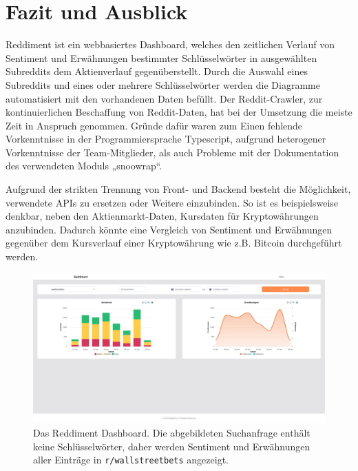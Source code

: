 \documentclass[a4paper, 10pt, conference]{IEEEtran}
\begin{document}
\section{Fazit und Ausblick} \label{s:fazit}

Reddiment ist ein webbasiertes Dashboard, welches den zeitlichen Verlauf von Sentiment und Erwähnungen bestimmter Schlüsselwörter in ausgewählten Subreddits dem Aktienverlauf gegenüberstellt. Durch die Auswahl eines Subreddits und eines oder mehrere Schlüsselwörter werden die Diagramme automatisiert mit den vorhandenen Daten befüllt.
Der Reddit-Crawler, zur kontinuierlichen Beschaffung von Reddit-Daten, hat bei der Umsetzung die meiste Zeit in Anspruch genommen. Gründe dafür waren zum Einen fehlende Vorkenntnisse in der Programmiersprache Typescript, aufgrund heterogener Vorkenntnisse der Team-Mitglieder, als auch Probleme mit der Dokumentation des verwendeten Moduls „snoowrap“. 

Aufgrund der strikten Trennung von Front- und Backend  besteht die Möglichkeit, verwendete APIs zu ersetzen oder Weitere einzubinden. So ist es beispielsweise denkbar, neben den Aktienmarkt-Daten, Kursdaten für Kryptowährungen anzubinden. Dadurch könnte eine Vergleich von Sentiment und Erwähnungen gegenüber dem Kursverlauf einer Kryptowährung wie z.B. Bitcoin durchgeführt werden.

\newpage

\printbibliography

\newpage

\begin{figure}
  \includegraphics[page=1, width=\columnwidth]{Reddiment_Overview}
  \caption{Das Reddiment Dashboard. Die abgebildeten Suchanfrage enthält keine Schlüsselwörter, daher werden Sentiment und Erwähnungen aller Einträge in \texttt{r/wallstreetbets} angezeigt.}
  \label{fig:extended_layers}
  \end{figure}
\end{document}
